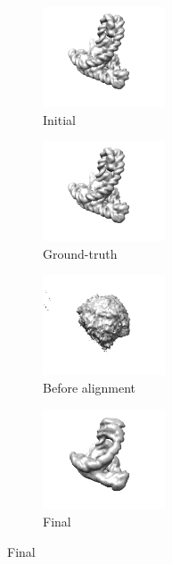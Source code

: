 \begin{figure}[t]
    \centering
    \begin{subfigure}[b]{0.23\linewidth}
        \centering
        \includegraphics[height=8em]{figures/5j0n_fullcvg_noise0_init}
        \caption{Initial}%
        \label{fig:5j0n-noise0-reconstruction-recovered}
    \end{subfigure}
    \hfill
    \begin{subfigure}[b]{0.23\linewidth}
        \centering
        \includegraphics[height=8em]{figures/5j0n_fullcvg_noise0_gt}
        \caption{Ground-truth}%
        \label{fig:5j0n-noise0-reconstruction-true}
    \end{subfigure}
    \hfill
    \begin{subfigure}[b]{0.23\linewidth}
        \centering
        \includegraphics[height=8em]{figures/5j0n_fullcvg_noise0_ap}
        \caption{Before alignment}%
        \label{fig:5j0n-noise0-reconstruction-recovered}
    \end{subfigure}
    \hfill
    \begin{subfigure}[b]{0.23\linewidth}
        \centering
        \includegraphics[height=8em]{figures/5j0n_fullcvg_noise0_apr}
        \caption{Final}%
        \label{fig:5j0n-noise0-reconstruction-true}

\end{subfigure}
\end{figure}
